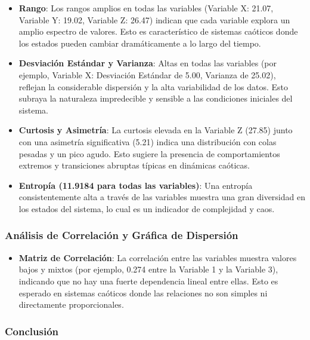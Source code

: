 \documentclass[11pt]{article}
\providecommand{\tightlist}{%
      \setlength{\itemsep}{0pt}\setlength{\parskip}{0pt}}
\begin{document}
\begin{itemize}
\item
  \textbf{Rango}: Los rangos amplios en todas las variables (Variable X:
  21.07, Variable Y: 19.02, Variable Z: 26.47) indican que cada variable
  explora un amplio espectro de valores. Esto es característico de
  sistemas caóticos donde los estados pueden cambiar dramáticamente a lo
  largo del tiempo.
\item
  \textbf{Desviación Estándar y Varianza}: Altas en todas las variables
  (por ejemplo, Variable X: Desviación Estándar de 5.00, Varianza de
  25.02), reflejan la considerable dispersión y la alta variabilidad de
  los datos. Esto subraya la naturaleza impredecible y sensible a las
  condiciones iniciales del sistema.
\item
  \textbf{Curtosis y Asimetría}: La curtosis elevada en la Variable Z
  (27.85) junto con una asimetría significativa (5.21) indica una
  distribución con colas pesadas y un pico agudo. Esto sugiere la
  presencia de comportamientos extremos y transiciones abruptas típicas
  en dinámicas caóticas.
\item
  \textbf{Entropía (11.9184 para todas las variables)}: Una entropía
  consistentemente alta a través de las variables muestra una gran
  diversidad en los estados del sistema, lo cual es un indicador de
  complejidad y caos.
\end{itemize}

\hypertarget{anuxe1lisis-de-correlaciuxf3n-y-gruxe1fica-de-dispersiuxf3n}{%
\subsubsection{Análisis de Correlación y Gráfica de
Dispersión}\label{anuxe1lisis-de-correlaciuxf3n-y-gruxe1fica-de-dispersiuxf3n}}

\begin{itemize}
\tightlist
\item
  \textbf{Matriz de Correlación}: La correlación entre las variables
  muestra valores bajos y mixtos (por ejemplo, 0.274 entre la Variable 1
  y la Variable 3), indicando que no hay una fuerte dependencia lineal
  entre ellas. Esto es esperado en sistemas caóticos donde las
  relaciones no son simples ni directamente proporcionales.
\end{itemize}

\hypertarget{conclusiuxf3n}{%
\subsubsection{Conclusión}\label{conclusiuxf3n}}
\end{document}
